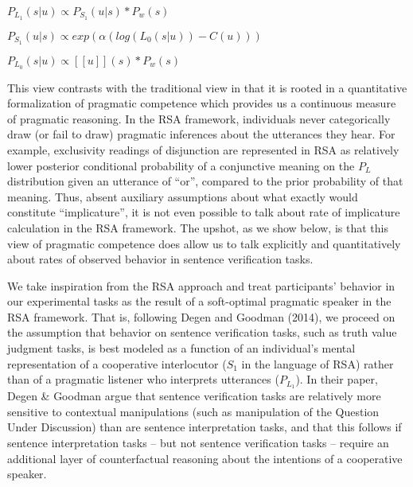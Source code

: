 \documentclass[man]{apa6}
\theoremstyle{definition}
\theoremstyle{definition}
\theoremstyle{definition}
\theoremstyle{remark}
\begin{document}
\(P_{L_1}(s | u) \propto P_{S_1}(u | s) * P_w(s)\)

\(P_{S_1}(u | s) \propto exp(\alpha(log(L_0(s | u)) - C(u)))\)

\(P_{L_0}(s | u) \propto [[u]](s) * P_w(s)\)

This view contrasts with the traditional view in that it is rooted in a
quantitative formalization of pragmatic competence which provides us a
continuous measure of pragmatic reasoning. In the RSA framework,
individuals never categorically draw (or fail to draw) pragmatic
inferences about the utterances they hear. For example, exclusivity
readings of disjunction are represented in RSA as relatively lower
posterior conditional probability of a conjunctive meaning on the
\(P_L\) distribution given an utterance of \enquote{or}, compared to the
prior probability of that meaning. Thus, absent auxiliary assumptions
about what exactly would constitute \enquote{implicature}, it is not
even possible to talk about rate of implicature calculation in the RSA
framework. The upshot, as we show below, is that this view of pragmatic
competence does allow us to talk explicitly and quantitatively about
rates of observed behavior in sentence verification tasks.

We take inspiration from the RSA approach and treat participants'
behavior in our experimental tasks as the result of a soft-optimal
pragmatic speaker in the RSA framework. That is, following Degen and
Goodman (2014), we proceed on the assumption that behavior on sentence
verification tasks, such as truth value judgment tasks, is best modeled
as a function of an individual's mental representation of a cooperative
interlocutor (\(S_1\) in the language of RSA) rather than of a pragmatic
listener who interprets utterances (\(P_{L_1}\)). In their paper, Degen
\& Goodman argue that sentence verification tasks are relatively more
sensitive to contextual manipulations (such as manipulation of the
Question Under Discussion) than are sentence interpretation tasks, and
that this follows if sentence interpretation tasks -- but not sentence
verification tasks -- require an additional layer of counterfactual
reasoning about the intentions of a cooperative speaker.
\end{document}
